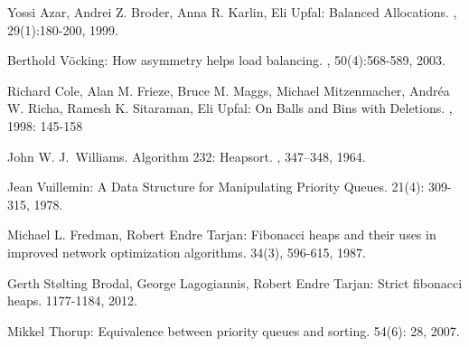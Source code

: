 \documentclass[11pt]{article}
\begin{document}
\begin{thebibliography}{42}

Yossi Azar, Andrei Z. Broder, Anna R. Karlin, Eli Upfal:
\newblock Balanced Allocations. 
, 29(1):180-200, 1999.

Berthold V\"ocking:
\newblock How asymmetry helps load balancing.
, 50(4):568-589, 2003.

Richard Cole, Alan M. Frieze, Bruce M. Maggs, Michael Mitzenmacher, Andréa W. Richa, Ramesh K. Sitaraman, Eli Upfal:
\newblock On Balls and Bins with Deletions. 
, 1998: 145-158

John W. J.~Williams.
\newblock Algorithm 232: Heapsort.
, 347--348, 1964.

Jean Vuillemin:
\newblock A Data Structure for Manipulating Priority Queues. 
 21(4): 309-315, 1978.

Michael L. Fredman, Robert Endre Tarjan:
\newblock Fibonacci heaps and their uses in improved network optimization algorithms.
 34(3), 596-615, 1987.

Gerth Stølting Brodal, George Lagogiannis, Robert Endre Tarjan:
\newblock Strict fibonacci heaps. 
 1177-1184, 2012.

Mikkel Thorup:
\newblock Equivalence between priority queues and sorting.
 54(6): 28, 2007.



\end{thebibliography}
\end{document}
